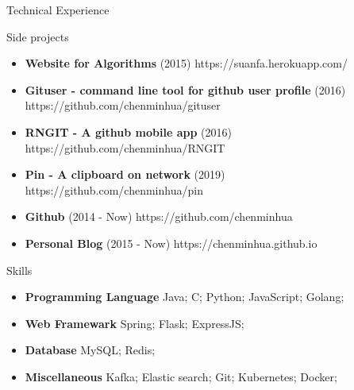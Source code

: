 \documentclass[]{minhuacv}
\begin{document}
	\begin{cvsection}{Technical Experience}
		\begin{cvsubsection}{Side projects}{}{}
			\begin{itemize}
				\item \textbf{Website for Algorithms} (2015) https://suanfa.herokuapp.com/
				\item \textbf{Gituser - command line tool for github user profile} (2016) https://github.com/chenminhua/gituser 
				\item \textbf{RNGIT - A github mobile app} (2016) https://github.com/chenminhua/RNGIT
				\item \textbf{Pin - A clipboard on network} (2019) https://github.com/chenminhua/pin
				\item \textbf{Github} (2014 - Now) https://github.com/chenminhua
				\item \textbf{Personal Blog} (2015 - Now) https://chenminhua.github.io
			\end{itemize}
		\end{cvsubsection}
	\end{cvsection}
	
	\begin{cvsection}{Skills}
		\begin{cvsubsection}{}{}{}	
			\begin{itemize}
				\item \textbf{Programming Language} Java; C; Python; JavaScript; Golang;
				\item \textbf{Web Framewark} Spring; Flask; ExpressJS;
				\item \textbf{Database} MySQL; Redis; 
				\item \textbf{Miscellaneous} Kafka; Elastic search; Git; Kubernetes; Docker;
			\end{itemize}
		\end{cvsubsection}
	\end{cvsection}
	
\end{document}
